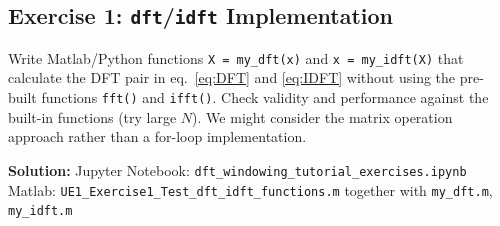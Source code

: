 \documentclass[11pt,a4paper,DIV=12]{scrartcl}
\begin{document}
\subsection*{Exercise 1: \texttt{dft}/\texttt{idft} Implementation}
Write Matlab/Python functions \texttt{X = my\_dft(x)} and \texttt{x = my\_idft(X)}
that calculate the DFT pair in eq.~\eqref{eq:DFT} and \eqref{eq:IDFT}
without using the pre-built functions \texttt{fft()} and \texttt{ifft()}.
%
Check validity and performance against the built-in functions (try large $N$).
%
We might consider the matrix operation approach rather than a for-loop
implementation.

\begin{Loesung}
\textbf{Solution:}
Jupyter Notebook: \texttt{dft\_windowing\_tutorial\_exercises.ipynb}
\\Matlab: \texttt{UE1\_Exercise1\_Test\_dft\_idft\_functions.m}
together with \texttt{my\_dft.m}, \texttt{my\_idft.m}
\end{Loesung}



\end{document}
